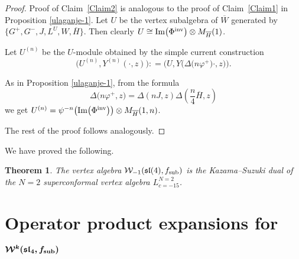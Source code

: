 \documentclass[11pt]{article}
\numberwithin{equation}{section}
\newtheorem{Theorem}{Theorem}[section]
\begin{document}
\begin{proof}
Proof of Claim~\ref{Claim2} is analogous to the proof of Claim~\ref{Claim1} in Proposition \ref{ulaganje-1}. Let $U$ be the vertex subalgebra of $\overline W$ generated by $\big\{ G^+, G^-, J, L^U, W, \overline{H} \big\}$. Then clearly $U \cong \operatorname{Im} \bigl(\Phi^{\rm inv}\bigr) \otimes M_{\overline{H}} (1)$.

Let $ U^{(n)} $ be the $U$-module obtained by the simple current construction
\[ \bigl(U^{(n)}, Y^{(n)} (\cdot, z)\bigr): = \bigl(U , Y\bigl(\Delta\bigl(n \varphi^+\bigr) \cdot, z\bigr)\bigr).
\]

As in Proposition \ref{ulaganje-1}, from the formula
\[%
\Delta\bigl(n\varphi^+, z\bigr) = \Delta( nJ, z) \Delta\left(\frac{n}{4} \overline{H}, z\right)
\]
we get
$U^{(n)}= \psi^{-n}\bigl( \operatorname{Im} \bigl(\Phi^{\rm inv}\bigr)\bigr) \otimes M_{\overline{H}} (1,n )$.


The rest of the proof follows analogously.
\end{proof}

We have proved the following.

\begin{Theorem} The vertex algebra $\mathcal{W}_{-1}(\mathfrak{sl}(4), f_{\rm sub})$ is the Kazama--Suzuki dual of the $N=2$ superconformal vertex algebra $L^{N=2}_{c=-15}$.
\end{Theorem}

\appendix\setcounter{section}{1}
 \section[Operator product expansions for W\^{}k(sl\_4, f\_sub)]{Operator product expansions for $\boldsymbol{\mathcal{W}^{k}(\mathfrak{sl}_4, f_{\rm sub})}$}
 \label{appendix-b}
\end{document}
